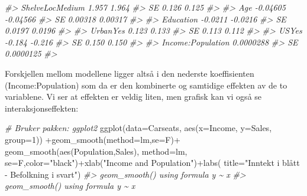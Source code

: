 \documentclass[
]{article}
\newenvironment{Shaded}{\begin{snugshade}}{\end{snugshade}}
\newcommand{\AttributeTok}[1]{\textcolor[rgb]{0.77,0.63,0.00}{#1}}
\newcommand{\CommentTok}[1]{\textcolor[rgb]{0.56,0.35,0.01}{\textit{#1}}}
\newcommand{\DecValTok}[1]{\textcolor[rgb]{0.00,0.00,0.81}{#1}}
\newcommand{\FunctionTok}[1]{\textcolor[rgb]{0.00,0.00,0.00}{#1}}
\newcommand{\NormalTok}[1]{#1}
\newcommand{\SpecialCharTok}[1]{\textcolor[rgb]{0.00,0.00,0.00}{#1}}
\newcommand{\StringTok}[1]{\textcolor[rgb]{0.31,0.60,0.02}{#1}}
\begin{document}
\begin{Shaded}
\begin{Highlighting}[]
\CommentTok{\#\textgreater{} ShelveLocMedium       1.957     1.964}
\CommentTok{\#\textgreater{} SE                    0.126     0.125}
\CommentTok{\#\textgreater{}                                      }
\CommentTok{\#\textgreater{} Age                {-}0.04605  {-}0.04566}
\CommentTok{\#\textgreater{} SE                  0.00318   0.00317}
\CommentTok{\#\textgreater{}                                      }
\CommentTok{\#\textgreater{} Education           {-}0.0211   {-}0.0216}
\CommentTok{\#\textgreater{} SE                   0.0197    0.0196}
\CommentTok{\#\textgreater{}                                      }
\CommentTok{\#\textgreater{} UrbanYes              0.123     0.133}
\CommentTok{\#\textgreater{} SE                    0.113     0.112}
\CommentTok{\#\textgreater{}                                      }
\CommentTok{\#\textgreater{} USYes                {-}0.184    {-}0.216}
\CommentTok{\#\textgreater{} SE                    0.150     0.150}
\CommentTok{\#\textgreater{}                                      }
\CommentTok{\#\textgreater{} Income:Population           0.0000288}
\CommentTok{\#\textgreater{} SE                          0.0000125}
\CommentTok{\#\textgreater{} }
\end{Highlighting}
\end{Shaded}

Forskjellen mellom modellene ligger altså i den nederste koeffisienten (Income:Population) som da er den kombinerte og samtidige effekten av de to variablene. Vi ser at effekten er veldig liten, men grafisk kan vi også se interaksjonseffekten:

\begin{Shaded}
\begin{Highlighting}[]
\CommentTok{\# Bruker pakken: ggplot2}
\FunctionTok{ggplot}\NormalTok{(}\AttributeTok{data=}\NormalTok{Carseats, }\FunctionTok{aes}\NormalTok{(}\AttributeTok{x=}\NormalTok{Income, }\AttributeTok{y=}\NormalTok{Sales, }\AttributeTok{group=}\DecValTok{1}\NormalTok{)) }\SpecialCharTok{+}\FunctionTok{geom\_smooth}\NormalTok{(}\AttributeTok{method=}\NormalTok{lm,}\AttributeTok{se=}\NormalTok{F)}\SpecialCharTok{+} 
    \FunctionTok{geom\_smooth}\NormalTok{(}\FunctionTok{aes}\NormalTok{(Population,Sales), }\AttributeTok{method=}\NormalTok{lm, }\AttributeTok{se=}\NormalTok{F,}\AttributeTok{color=}\StringTok{"black"}\NormalTok{)}\SpecialCharTok{+}\FunctionTok{xlab}\NormalTok{(}\StringTok{"Income and Population"}\NormalTok{)}\SpecialCharTok{+}\FunctionTok{labs}\NormalTok{(}
        \AttributeTok{title=}\StringTok{"Inntekt i blått {-} Befolkning i svart"}\NormalTok{)}
\CommentTok{\#\textgreater{} \textasciigrave{}geom\_smooth()\textasciigrave{} using formula \textquotesingle{}y \textasciitilde{} x\textquotesingle{}}
\CommentTok{\#\textgreater{} \textasciigrave{}geom\_smooth()\textasciigrave{} using formula \textquotesingle{}y \textasciitilde{} x\textquotesingle{}}
\end{Highlighting}
\end{Shaded}
\end{document}
